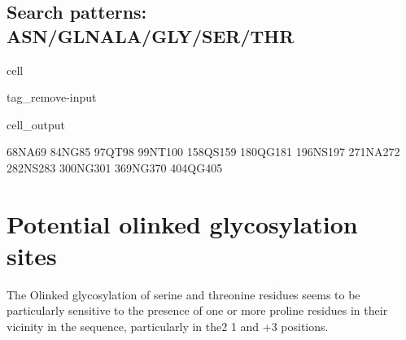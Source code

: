 \documentclass[letterpaper,10pt,english]{jupyterBook}
\begin{document}
\subsection{Search patterns: ASN/GLN\sphinxhyphen{}ALA/GLY/SER/THR}
\label{\detokenize{ipynb/chapter2:search-patterns-asn-gln-ala-gly-ser-thr}}
\begin{sphinxuseclass}{cell}
\begin{sphinxuseclass}{tag_remove-input}\begin{sphinxVerbatimOutput}

\begin{sphinxuseclass}{cell_output}
\begin{sphinxVerbatim}[commandchars=\\\{\}]
68\PYGZhy{}NA\PYGZhy{}69
84\PYGZhy{}NG\PYGZhy{}85
97\PYGZhy{}QT\PYGZhy{}98
99\PYGZhy{}NT\PYGZhy{}100
158\PYGZhy{}QS\PYGZhy{}159
180\PYGZhy{}QG\PYGZhy{}181
196\PYGZhy{}NS\PYGZhy{}197
271\PYGZhy{}NA\PYGZhy{}272
282\PYGZhy{}NS\PYGZhy{}283
300\PYGZhy{}NG\PYGZhy{}301
369\PYGZhy{}NG\PYGZhy{}370
404\PYGZhy{}QG\PYGZhy{}405
\end{sphinxVerbatim}

\end{sphinxuseclass}\end{sphinxVerbatimOutput}

\end{sphinxuseclass}
\end{sphinxuseclass}

\section{Potential o\sphinxhyphen{}linked glycosylation sites}
\label{\detokenize{ipynb/chapter2:potential-o-linked-glycosylation-sites}}
\sphinxAtStartPar
The O\sphinxhyphen{}linked glycosylation of serine and threonine residues seems to be particularly sensitive to
the presence of one or more proline residues in their vicinity in the sequence, particularly in the2
\sphinxhyphen{}1 and +3 positions.
\end{document}
